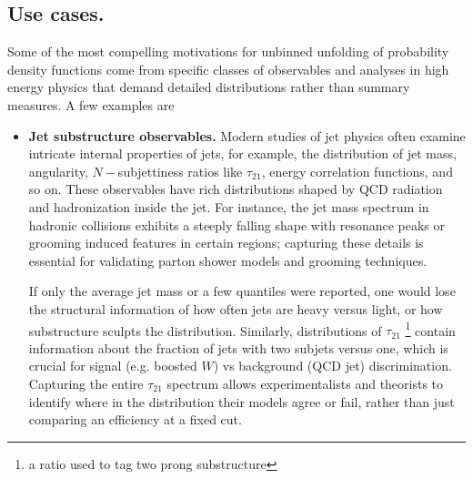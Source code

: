     \subsection{Use cases.}
    Some of the most compelling motivations for unbinned unfolding of probability density functions come from specific classes of observables and analyses in high energy physics that demand detailed distributions rather than summary measures.
    A few examples are
    \begin{itemize}
        \item \textbf{Jet substructure observables.}
            Modern studies of jet physics often examine intricate internal properties of jets, for example, the distribution of jet mass, angularity, $N-$subjettiness ratios like $\tau_{21}$, energy correlation functions, and so on.
            These observables have rich distributions shaped by QCD radiation and hadronization inside the jet.
            For instance, the jet mass spectrum in hadronic collisions exhibits a steeply falling shape with resonance peaks or grooming induced features in certain regions;
            capturing these details is essential for validating parton shower models and grooming techniques.
            
            If only the average jet mass or a few quantiles were reported, one would lose the structural information of how often jets are heavy versus light, or how substructure sculpts the distribution.
            Similarly, distributions of $\tau_{21}$ \footnote{a ratio used to tag two prong substructure} contain information about the fraction of jets with two subjets versus one, which is crucial for signal (e.g. boosted $W$) vs background (QCD jet) discrimination.
            Capturing the entire $\tau_{21}$ spectrum allows experimentalists and theorists to identify where in the distribution their models agree or fail, rather than just comparing an efficiency at a fixed cut.
            

\end{itemize}

